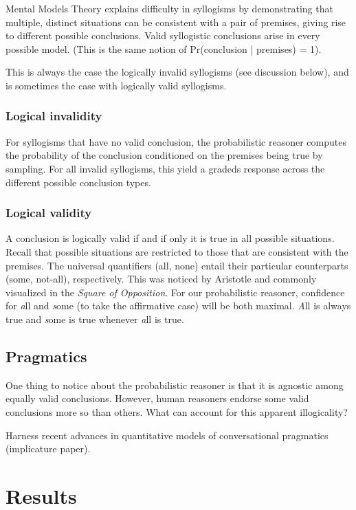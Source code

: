 \documentclass[10pt,letterpaper]{article}
\begin{document}
Mental Models Theory explains difficulty in syllogisms by demonstrating that multiple, distinct situations can be consistent with a pair of premises, giving rise to different possible conclusions. Valid syllogistic conclusions arise in every possible model. (This is the same notion of Pr(conclusion | premises) = 1). 

This is always the case the logically invalid syllogisms (see discussion below), and is sometimes the case with logically valid syllogisms.

\subsubsection{Logical invalidity}
For syllogisms that have no valid conclusion, the probabilistic reasoner computes the probability of the conclusion conditioned on the premises being true by sampling. For all invalid syllogisms, this yield a gradeds response across the different possible conclusion types. 


\subsubsection{Logical validity}
A conclusion is logically valid if and if only it is true in all possible situations. Recall that possible situations are restricted to those that are consistent with the premises. The universal quantifiers (all, none) entail their particular counterparts (some, not-all), respectively. This was noticed by Aristotle and commonly visualized in the \emph{Square of Opposition}. For our probabilistic reasoner, confidence for {\emph all} and {\emph some} (to take the affirmative case) will be both maximal. {\emph All} is always true and {\emph some} is true whenever {\emph all} is true.


\subsection{Pragmatics}

One thing to notice about the probabilistic reasoner is that it is agnostic among equally valid conclusions. However, human reasoners endorse some valid conclusions more so than others. What can account for this apparent illogicality?  



Harness recent advances in quantitative models of conversational pragmatics (implicature paper). 

\section{Results}
\end{document}
